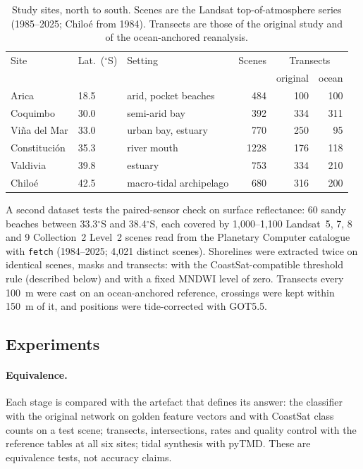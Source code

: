 \documentclass[authoryear,preprint,review,12pt]{elsarticle}
\begin{document}
\begin{table}[t]
  \centering
  \small
  \caption{Study sites, north to south. Scenes are the Landsat
  top-of-atmosphere series (1985--2025; Chilo\'e from 1984). Transects are
  those of the original study and of the ocean-anchored reanalysis.}
  \label{tab:sites}
  \begin{tabular}{@{}lllrrr@{}}
    \toprule
    Site & Lat.\ ($^\circ$S) & Setting & Scenes & \multicolumn{2}{c}{Transects} \\
         &                   &         &        & original & ocean \\
    \midrule
    Arica          & 18.5 & arid, pocket beaches   & 484  & 100 & 100 \\
    Coquimbo       & 30.0 & semi-arid bay          & 392  & 334 & 311 \\
    Vi\~na del Mar & 33.0 & urban bay, estuary     & 770  & 250 & 95 \\
    Constituci\'on & 35.3 & river mouth            & 1228 & 176 & 118 \\
    Valdivia       & 39.8 & estuary                & 753  & 334 & 210 \\
    Chilo\'e       & 42.5 & macro-tidal archipelago & 680 & 316 & 200 \\
    \bottomrule
  \end{tabular}
\end{table}

A second dataset tests the paired-sensor check on surface reflectance: 60
sandy beaches between 33.3$^\circ$S and 38.4$^\circ$S, each covered by
1,000--1,100 Landsat~5, 7, 8 and 9 Collection~2 Level~2 scenes read from the
Planetary Computer catalogue with \texttt{fetch} (1984--2025; 4,021 distinct
scenes). Shorelines were extracted twice on identical scenes, masks and
transects: with the CoastSat-compatible threshold rule (described below) and
with a fixed MNDWI level of zero. Transects every 100~m were cast on an
ocean-anchored reference, crossings were kept within 150~m of it, and positions
were tide-corrected with GOT5.5.

\subsection{Experiments}
\paragraph{Equivalence.} Each stage is compared with the artefact that defines
its answer: the classifier with the original network on golden feature vectors
and with CoastSat class counts on a test scene; transects, intersections, rates
and quality control with the reference tables at all six sites; tidal
synthesis with pyTMD. These are equivalence tests, not accuracy claims.
\end{document}
